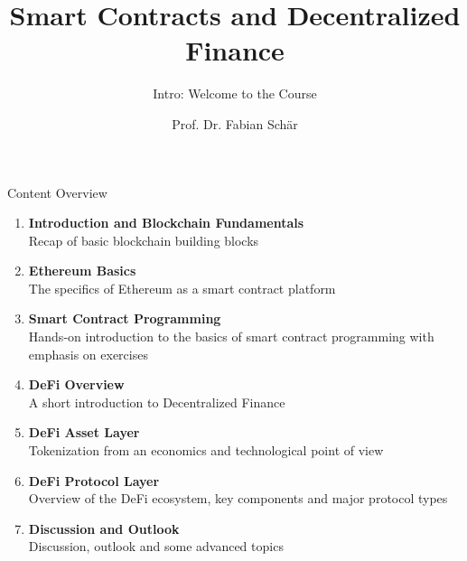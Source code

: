 \documentclass[handout]{beamer}
\title{Smart Contracts and Decentralized Finance}
\subtitle{Intro: Welcome to the Course}
\author{Prof. Dr. Fabian Schär}
\institute{University of Basel}
\begin{document}
\thispagestyle{empty}
\begin{frame}[noframenumbering]
	\titlepage
\end{frame}

\begin{frame}{Content Overview}
\small
\begin{enumerate}
	\item<1-> \textbf{Introduction and Blockchain Fundamentals}\\
		Recap of basic blockchain building blocks
		\vspace{0.2em}
	\item<2-> \textbf{Ethereum Basics}\\
		The specifics of Ethereum as a smart contract platform
		\vspace{0.2em}
	\item<3-> \textbf{Smart Contract Programming}\\
		Hands-on introduction to the basics of smart contract programming with emphasis on exercises
	\item<4-> \textbf{DeFi Overview}\\
		A short introduction to Decentralized Finance
		\vspace{0.2em}
	\item<5-> \textbf{DeFi Asset Layer}\\
		Tokenization from an economics and technological point of view
		\vspace{0.2em}
	\item<6-> \textbf{DeFi Protocol Layer}\\
			Overview of the DeFi ecosystem, key components and major protocol types
	\item<7-> \textbf{Discussion and Outlook}\\
			Discussion, outlook and some advanced topics
\end{enumerate}

\end{frame}
\end{document}
